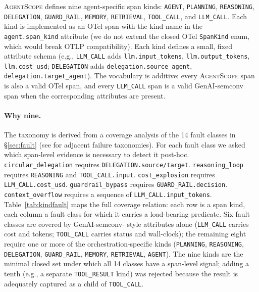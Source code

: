 \documentclass[sigplan,10pt,anonymous,review]{acmart}
\newcommand{\sysname}{\textsc{AgentScope}\xspace}
\begin{document}
\sysname{} defines nine agent-specific span kinds:
\texttt{AGENT}, \texttt{PLANNING}, \texttt{REASONING},
\texttt{DELEGATION}, \texttt{GUARD\_RAIL}, \texttt{MEMORY},
\texttt{RETRIEVAL}, \texttt{TOOL\_CALL}, and \texttt{LLM\_CALL}. Each
kind is implemented as an OTel span with the kind name in the
\texttt{agent.span\_kind} attribute (we do not extend the closed OTel
\texttt{SpanKind} enum, which would break OTLP compatibility). Each kind
defines a small, fixed attribute schema (e.g., \texttt{LLM\_CALL} adds
\texttt{llm.input\_tokens}, \texttt{llm.output\_tokens},
\texttt{llm.cost\_usd}; \texttt{DELEGATION} adds
\texttt{delegation.source\_agent}, \texttt{delegation.target\_agent}).
The vocabulary is additive: every \sysname span is also a valid OTel
span, and every \texttt{LLM\_CALL} span is a valid GenAI-semconv span
when the corresponding attributes are present.

\paragraph{Why nine.} The taxonomy is derived from a coverage analysis
of the 14 fault classes in \S\ref{sec:fault} (see
\cite{mast,agentdebug,aegis} for adjacent failure taxonomies). For each
fault class we asked which span-level evidence is necessary to detect it
post-hoc. \texttt{circular\_delegation} requires
\texttt{DELEGATION.source/target}. \texttt{reasoning\_loop} requires
\texttt{REASONING} and \texttt{TOOL\_CALL.input}. \texttt{cost\_explosion}
requires \texttt{LLM\_CALL.cost\_usd}. \texttt{guardrail\_bypass}
requires \texttt{GUARD\_RAIL.decision}. \texttt{context\_overflow}
requires a sequence of \texttt{LLM\_CALL.input\_tokens}.
Table~\ref{tab:kindfault} maps the full coverage relation: each row is
a span kind, each column a fault class for which it carries a
load-bearing predicate. Six fault classes are covered by GenAI-semconv-
style attributes alone (\texttt{LLM\_CALL} carries cost and tokens;
\texttt{TOOL\_CALL} carries status and wall-clock); the remaining eight
require one or more of the orchestration-specific kinds
(\texttt{PLANNING}, \texttt{REASONING}, \texttt{DELEGATION},
\texttt{GUARD\_RAIL}, \texttt{MEMORY}, \texttt{RETRIEVAL},
\texttt{AGENT}). The nine kinds are the minimal closed set under which
all 14 classes have a span-level signal; adding a tenth (e.g., a
separate \texttt{TOOL\_RESULT} kind) was rejected because the result is
adequately captured as a child of \texttt{TOOL\_CALL}.
\end{document}
